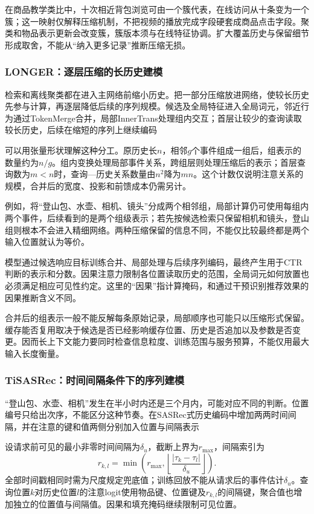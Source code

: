 在商品教学类比中，十次相近背包浏览可由一个簇代表，在线访问从十条变为一个簇；这一映射仅解释压缩机制，不把视频的播放完成字段硬套成商品点击字段。聚类和物品表示更新会改变簇，簇版本须与在线特征协调。扩大覆盖历史与保留细节形成取舍，不能从“纳入更多记录”推断压缩无损。

\subsubsection{LONGER：逐层压缩的长历史建模}
\label{sec:rs-longer}

检索和离线聚类都在进入主网络前缩小历史。把一部分压缩放进网络，使较长历史先参与计算，再逐层降低后续的序列规模。候选及全局特征进入全局词元，邻近行为通过TokenMerge合并，局部InnerTrans处理组内交互；首层让较少的查询读取较长历史，后续在缩短的序列上继续编码

可以用张量形状理解这种分工。原历史长$n$，相邻$g$个事件组成一组后，组表示的数量约为$n/g$。组内变换处理局部事件关系，跨组层则处理压缩后的表示；首层查询数为$m<n$时，查询—历史关系数量由$n^2$降为$mn$。这个计数仅说明注意关系的规模，合并后的宽度、投影和前馈成本仍需另计。

例如，将“登山包、水壶、相机、镜头”分成两个相邻组，局部计算仍可使用每组内两个事件，后续看到的是两个组级表示；若先按候选检索只保留相机和镜头，登山组则根本不会进入精细网络。两种压缩保留的信息不同，不能仅比较最终都是两个输入位置就认为等价。

模型通过候选响应目标训练合并、局部处理与后续序列编码，最终产生用于CTR判断的表示和分数。因果注意力限制各位置读取历史的范围，全局词元如何放置也必须满足相应可见性约定。这里的“因果”指计算掩码，和通过干预识别推荐效果的因果推断含义不同。

合并后的组表示一般不能反解每条原始记录，局部顺序也可能只以压缩形式保留。缓存能否复用取决于候选是否已经影响缓存位置、历史是否追加以及参数是否变更。因而长上下文能力要同时检查信息粒度、训练范围与服务预算，不能仅用最大输入长度衡量。

\subsubsection{TiSASRec：时间间隔条件下的序列建模}
\label{sec:rs-tisasrec}

“登山包、水壶、相机”发生在半小时内还是三个月内，可能对应不同的判断。位置编号只给出次序，不能区分这种节奏。在SASRec式历史编码中增加两两时间间隔，并在注意的键和值两侧分别加入位置与间隔表示

设请求前可见的最小非零时间间隔为$\delta_u$，截断上界为$r_{\max}$，间隔索引为
\begin{equation}
  r_{k,l}=\min\left(r_{\max},
     \left\lfloor\frac{|\tau_k-\tau_l|}{\delta_u}\right\rfloor\right).
  \label{eq:rs-tisasrec-time}
\end{equation}
全部时间戳相同时需为尺度规定兜底值；训练回放不能从请求后的事件估计$\delta_u$。查询位置$k$对历史位置$l$的注意logit使用物品键、位置键及$r_{k,l}$的间隔键，聚合值也增加独立的位置值与间隔值。因果和填充掩码继续限制可见位置。

